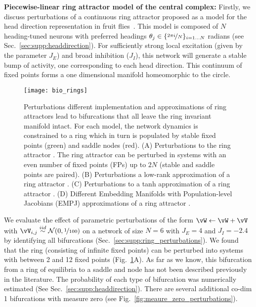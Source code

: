 \documentclass{article} %
\newcounter{ct}
\newcommand{\iidsample}{\stackrel{iid}{\sim}}
\theoremstyle{definition}
\theoremstyle{remark}
\begin{document}
\newcommand{\ptitle}[1]{\textbf{#1:}\xspace}
\ptitle{Piecewise-linear ring attractor model of the central complex}
Firstly, we discuss perturbations of a continuous ring attractor proposed as a model for the head direction representation in fruit flies~\citep{Noorman2022}.
This model is composed of $N$ heading-tuned neurons with preferred headings $\theta_j \in \{\nicefrac{2\pi i}{N}\}_{i=1\dots N}$ radians (see Sec.~\ref{sec:supp:headdirection}).
For sufficiently strong local excitation (given by the parameter $J_E$) and broad inhibition ($J_I$), this network will generate a stable bump of activity, one corresponding to each head direction.
This continuum of fixed points forms a one dimensional manifold homeomorphic to the circle.

\begin{figure}[tbhp]
     \centering
  \texttt{[image: bio\_rings]}
       \caption{ Perturbations different implementation and approximations of ring attractors lead to bifurcations that all leave the ring invariant manifold intact. For each model, the network dynamics is constrained to a ring which in turn is populated by stable fixed points (green) and saddle nodes (red).
       (A) Perturbations to the ring attractor \citep{Noorman2022}. The ring attractor can be perturbed in systems with an even number of fixed points (FPs) up to $2N$ (stable and saddle points are paired). 
       (B)  Perturbations a low-rank approximation of a ring attractor \citep{mastrogiuseppe2018}.
       (C)  Perturbations to a tanh approximation of a ring attractor \citep{seeholzer2017efficient}.
       (D)  Different Embedding Manifolds with Population-level Jacobians (EMPJ) approximations of a ring attractor \citep{pollock2020}.
       }
         \label{fig:bio_rings}
\end{figure}

We evaluate the effect of parametric perturbations of the form $ \vW \leftarrow \vW + \vV$ with $\vV_{i,j}\iidsample\mathcal{N}(0,\nicefrac{1}{100})$ on a network of size $N = 6$ with $J_E= 4$ and $J_I=-2.4$ by identifying all bifurcations (Sec.~\ref{sec:supp:ring_perturbations}).
We found that the ring (consisting of infinite fixed points) can be perturbed into systems with between 2 and 12 fixed points (Fig.~\ref{fig:bio_rings}A).
As far as we know, this bifurcation from a ring of equilibria to a saddle and node has not been described previously in the literature.
The probability of each type of bifurcation was numerically estimated (See Sec.~\ref{sec:supp:headdirection}).
There are several additional co-dim 1 bifurcations with measure zero (see Fig.~\ref{fig:meaure_zero_perturbations}).
\end{document}
